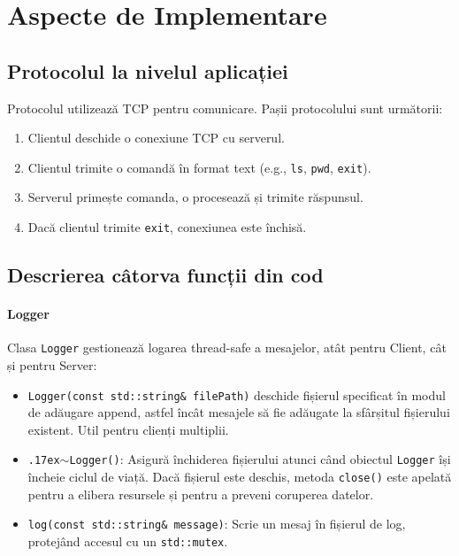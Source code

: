 \documentclass[runningheads]{llncs}
\begin{document}
\section{Aspecte de Implementare}
\subsection{Protocolul la nivelul aplicației}
Protocolul utilizează TCP pentru comunicare. Pașii protocolului sunt următorii:
\begin{enumerate}
    \item Clientul deschide o conexiune TCP cu serverul.
    \item Clientul trimite o comandă în format text (e.g., \texttt{ls}, \texttt{pwd}, \texttt{exit}).
    \item Serverul primește comanda, o procesează și trimite răspunsul.
    \item Dacă clientul trimite \texttt{exit}, conexiunea este închisă.
\end{enumerate}

\subsection{Descrierea câtorva funcții din cod}
\paragraph{Logger}
Clasa \texttt{Logger} gestionează logarea thread-safe a mesajelor, atât pentru Client, cât și pentru Server:
\begin{itemize}
    \item \texttt{Logger(const std::string\& filePath)} deschide fișierul specificat în modul de adăugare append, astfel încât mesajele să fie adăugate la sfârșitul fișierului existent. Util pentru clienți multiplii.
    \item \texttt{{\raise.17ex\hbox{$\scriptstyle\sim$}}Logger()}: Asigură închiderea fișierului atunci când obiectul \texttt{Logger} își încheie ciclul de viață. Dacă fișierul este deschis, metoda \texttt{close()} este apelată pentru a elibera resursele și pentru a preveni coruperea datelor.
    \item \texttt{log(const std::string\& message)}: Scrie un mesaj în fișierul de log, protejând accesul cu un \texttt{std::mutex}.
\end{itemize}
\end{document}
